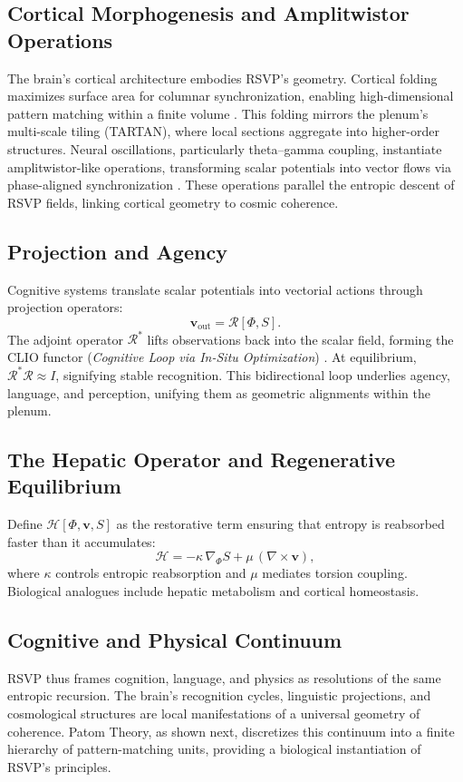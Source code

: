 \documentclass[11pt]{article}
\begin{document}
\subsection{Cortical Morphogenesis and Amplitwistor Operations}
The brain’s cortical architecture embodies RSVP’s geometry. Cortical folding maximizes surface area for columnar synchronization, enabling high-dimensional pattern matching within a finite volume \citep{seung2012connectome}. This folding mirrors the plenum’s multi-scale tiling (TARTAN), where local sections aggregate into higher-order structures. Neural oscillations, particularly theta--gamma coupling, instantiate amplitwistor-like operations, transforming scalar potentials into vector flows via phase-aligned synchronization \citep{alivisatos2012brain}. These operations parallel the entropic descent of RSVP fields, linking cortical geometry to cosmic coherence.

\subsection{Projection and Agency}
Cognitive systems translate scalar potentials into vectorial actions through projection operators:
\[
\mathbf{v}_{\mathrm{out}} = \mathcal{R}[\Phi,S].
\]
The adjoint operator $\mathcal{R}^\ast$ lifts observations back into the scalar field, forming the CLIO functor (\textit{Cognitive Loop via In-Situ Optimization}) \citep{cheng2025clio}. At equilibrium, $\mathcal{R}^\ast\mathcal{R} \approx I$, signifying stable recognition. This bidirectional loop underlies agency, language, and perception, unifying them as geometric alignments within the plenum.

\subsection{The Hepatic Operator and Regenerative Equilibrium}
Define $\mathcal{H}[\Phi,\mathbf{v},S]$ as the restorative term ensuring that entropy is reabsorbed faster than it accumulates:
\[
\mathcal{H} = -\kappa\,\nabla_{\!\Phi}S + \mu\,(\nabla\!\times\!\mathbf{v}),
\]
where $\kappa$ controls entropic reabsorption and $\mu$ mediates torsion coupling.
Biological analogues include hepatic metabolism and cortical homeostasis.


\subsection{Cognitive and Physical Continuum}
RSVP thus frames cognition, language, and physics as resolutions of the same entropic recursion. The brain’s recognition cycles, linguistic projections, and cosmological structures are local manifestations of a universal geometry of coherence. Patom Theory, as shown next, discretizes this continuum into a finite hierarchy of pattern-matching units, providing a biological instantiation of RSVP’s principles.
\end{document}
